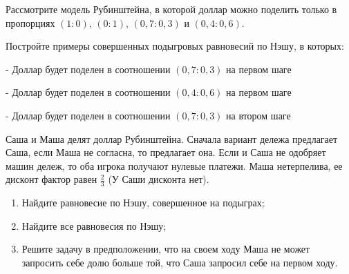\begin{problem}
Рассмотрите модель Рубинштейна, в которой доллар можно поделить только в пропорциях  $\left(1:0\right)$,  $\left(0:1\right)$,  $\left(0,7:0,3\right)$  и  $\left(0,4:0,6\right)$.\par
Постройте примеры совершенных подыгровых равновесий по Нэшу, в которых:\par
- Доллар будет поделен в соотношении  $\left(0,7:0,3\right)$  на первом шаге\par
- Доллар будет поделен в соотношении  $\left(0,4:0,6\right)$  на первом шаге\par
- Доллар будет поделен в соотношении  $\left(0,7:0,3\right)$  на втором шаге\par



\begin{sol}

\end{sol}
\end{problem}



\begin{problem}
\begin{source}
 [LSE, 1998]\end{source}
Саша и Маша делят доллар Рубинштейна. Сначала вариант дележа предлагает Саша, если Маша не согласна, то предлагает она. Если и Саша не одобряет машин дележ, то оба игрока получают нулевые платежи. Маша нетерпелива, ее дисконт фактор равен  $\frac{2}{3} $ (У Саши дисконта нет).\par
\begin{enumerate}
\item  Найдите равновесие по Нэшу, совершенное на подыграх;\par
\item Найдите все равновесия по Нэшу;\par
\item  Решите задачу в предположении, что на своем ходу Маша не может запросить себе долю больше той, что Саша запросил себе на первом ходу.
\end{enumerate}


\begin{sol}

\end{sol}
\end{problem}



